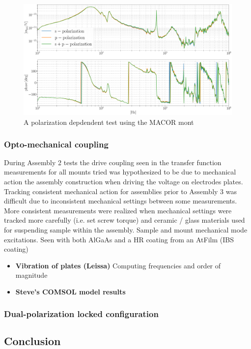 \begin{figure}[H]
    \includegraphics[width=\textwidth]{figs/ALGAAS/results_figs/assembly3/petgmsvv64.pdf}
    \caption{A polarization depdendent test using the MACOR mont}
    \label{fig:measurement_sum}
\end{figure}

\subsubsection{Opto-mechanical coupling}
During Assembly 2 tests the drive coupling seen in the transfer function measurements for all mounts tried was hypothesized to be due to mechanical action the assembly construction when driving the voltage on electrodes plates. Tracking consistent mechanical action for assemblies prior to Assembly 3 was difficult due to inconsistent mechanical settings between some measurements. More consistent measurements were realized when mechanical settings were tracked more carefully (i.e. set screw torque) and ceramic / glass materials used for suspending sample within the assembly. 
Sample and mount mechanical mode excitations. Seen with both AlGaAs and a HR coating from an AtFilm (IBS coating)
\begin{itemize}
\item \textbf{Vibration of plates (Leissa)} \cite{leissa} Computing frequencies and order of magnitude
\item \textbf{Steve's COMSOL model results}
\end{itemize}

\subsubsection{Dual-polarization locked configuration}

\subsection{Conclusion}
